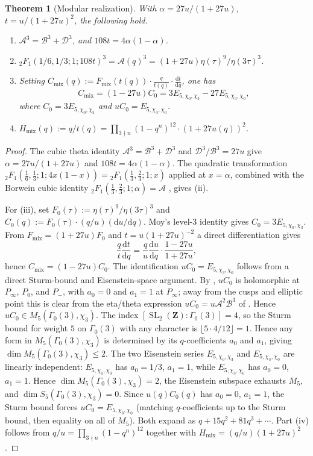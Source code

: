 \documentclass[11pt]{amsart}
\newtheorem{theorem}{Theorem}[section]
\theoremstyle{definition}
\theoremstyle{remark}
\newcommand{\Z}{\mathbf{Z}}
\newcommand{\dd}{\mathrm{d}}
\begin{document}
\begin{theorem}[Modular realization]\label{thm:modular}
With $\alpha=27u/(1+27u)$, $t=u/(1+27u)^2$, the following hold.
\begin{enumerate}[label=\textup{(\roman*)}]
\item $\mathcal A^3=\mathcal B^3+\mathcal D^3$, and $108t=4\alpha(1-\alpha)$.
\item ${}_2F_1(1/6,1/3;1;108t)^3=\mathcal A(q)^3=(1+27u)\eta(\tau)^9/\eta(3\tau)^3$.
\item Setting $C_{\mathrm{mix}}(q):=F_{\mathrm{mix}}(t(q))\cdot\frac{q}{t(q)}\cdot\frac{\dd t}{\dd q}$, one has
\[
C_{\mathrm{mix}}=(1-27u)C_0=3E_{5,\chi_0,\chi_3}-27E_{5,\chi_3,\chi_0},
\]
where $C_0=3E_{5,\chi_0,\chi_3}$ and $uC_0=E_{5,\chi_3,\chi_0}$.
\item $H_{\mathrm{mix}}(q):=q/t(q)=\prod_{3\nmid n}(1-q^n)^{12}\cdot(1+27u(q))^2$.
\end{enumerate}
\end{theorem}

\begin{proof}
The cubic theta identity $\mathcal A^3=\mathcal B^3+\mathcal D^3$ and $\mathcal D^3/\mathcal B^3=27u$ give $\alpha=27u/(1+27u)$ and $108t=4\alpha(1-\alpha)$. The quadratic transformation
${}_2F_1(\tfrac16,\tfrac13;1;4x(1-x))={}_2F_1(\tfrac13,\tfrac23;1;x)$
applied at $x=\alpha$, combined with the Borwein cubic identity ${}_2F_1(\tfrac13,\tfrac23;1;\alpha)=\mathcal A$ \cite{BBG}, gives (ii).

For (iii), set $F_0(\tau):=\eta(\tau)^9/\eta(3\tau)^3$ and $C_0(q):=F_0(\tau)\cdot(q/u)(\dd u/\dd q)$. Moy's level-$3$ identity \cite{Moy} gives $C_0=3E_{5,\chi_0,\chi_3}$. From $F_{\mathrm{mix}}=(1+27u)F_0$ and $t=u(1+27u)^{-2}$ a direct differentiation gives
\[
\frac{q}{t}\frac{\dd t}{\dd q}=\frac{q}{u}\frac{\dd u}{\dd q}\cdot\frac{1-27u}{1+27u},
\]
hence $C_{\mathrm{mix}}=(1-27u)C_0$. The identification $uC_0=E_{5,\chi_3,\chi_0}$ follows from a direct Sturm-bound and Eisenstein-space argument. By , $uC_0$ is holomorphic at $P_\infty$, $P_0$, and $P_-$, with $a_0=0$ and $a_1=1$ at $P_\infty$; away from the cusps and elliptic point this is clear from the eta/theta expression $uC_0=u\mathcal A^2\mathcal B^3$ of . Hence $uC_0\in M_5(\Gamma_0(3),\chi_3)$. The index $[\operatorname{SL}_2(\Z):\Gamma_0(3)]=4$, so the Sturm bound for weight $5$ on $\Gamma_0(3)$ with any character is $\lfloor 5\cdot 4/12\rfloor=1$. Hence any form in $M_5(\Gamma_0(3),\chi_3)$ is determined by its $q$-coefficients $a_0$ and $a_1$, giving $\dim M_5(\Gamma_0(3),\chi_3)\le 2$. The two Eisenstein series $E_{5,\chi_0,\chi_3}$ and $E_{5,\chi_3,\chi_0}$ are linearly independent: $E_{5,\chi_0,\chi_3}$ has $a_0=1/3$, $a_1=1$, while $E_{5,\chi_3,\chi_0}$ has $a_0=0$, $a_1=1$. Hence $\dim M_5(\Gamma_0(3),\chi_3)=2$, the Eisenstein subspace exhausts $M_5$, and $\dim S_5(\Gamma_0(3),\chi_3)=0$. Since $u(q)C_0(q)$ has $a_0=0$, $a_1=1$, the Sturm bound forces $uC_0=E_{5,\chi_3,\chi_0}$ (matching $q$-coefficients up to the Sturm bound, then equality on all of $M_5$). Both expand as $q+15q^2+81q^3+\cdots$. Part (iv) follows from $q/u=\prod_{3\nmid n}(1-q^n)^{12}$ together with $H_{\mathrm{mix}}=(q/u)(1+27u)^2$.
\end{proof}
\end{document}

